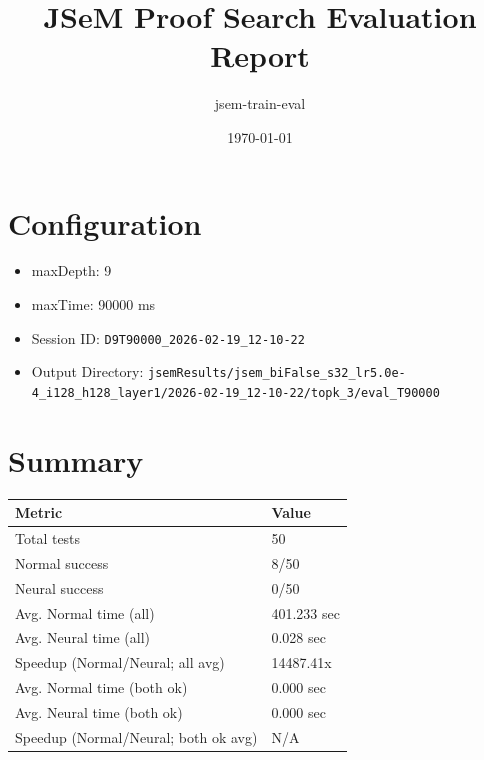 \documentclass[a4paper,10pt]{article}
\title{JSeM Proof Search Evaluation Report}
\author{jsem-train-eval}
\date{\today}
\begin{document}
\maketitle

\section{Configuration}
\begin{itemize}
\item maxDepth: 9
\item maxTime: 90000 ms
\item Session ID: \texttt{D9T90000\_2026-02-19\_12-10-22}
\item Output Directory: \texttt{jsemResults/jsem\_biFalse\_s32\_lr5.0e-4\_i128\_h128\_layer1/2026-02-19\_12-10-22/topk\_3/eval\_T90000}
\end{itemize}

\section{Summary}
\begin{tabular}{ll}
\toprule
\textbf{Metric} & \textbf{Value} \\
\midrule
Total tests & 50 \\
Normal success & 8/50 \\
Neural success & 0/50 \\
\midrule
Avg. Normal time (all) & 401.233 sec \\
Avg. Neural time (all) & 0.028 sec \\
Speedup (Normal/Neural; all avg) & 14487.41x \\
Avg. Normal time (both ok) & 0.000 sec \\
Avg. Neural time (both ok) & 0.000 sec \\
Speedup (Normal/Neural; both ok avg) & N/A \\
\bottomrule
\end{tabular}
\end{document}
